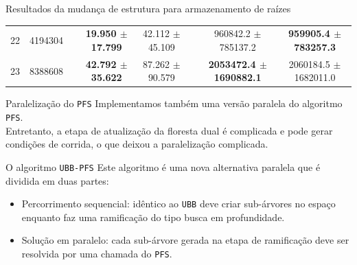\documentclass{beamer}
\newcommand{\algname}[1]{\texttt{#1}}
\begin{document}
\begin{frame}{Resultados da mudança de estrutura para armazenamento de raízes}
\begin{table}
{\begin{tabular}{cc c cc c cc}
22 & 4194304 &&  \textbf{19.950 $\pm$ 17.799} & 42.112 $\pm$ 45.109 &&  960842.2 $\pm$ 785137.2 & \textbf{959905.4 $\pm$ 783257.3} \\
23 & 8388608 &&  \textbf{42.792 $\pm$ 35.622} & 87.262 $\pm$ 90.579 &&  \textbf{2053472.4 $\pm$ 1690882.1} & 2060184.5 $\pm$ 1682011.0 \\
\bottomrule 
\end{tabular}%
}
\end{table}
\end{frame}


\begin{frame}{Paralelização do \algname{PFS}}
Implementamos também uma versão paralela do algoritmo \algname{PFS}.
\vspace{1em}
\pause\\

Entretanto, a etapa de atualização da floresta dual é complicada e pode 
gerar condições de corrida, o que deixou a paralelização complicada.
\end{frame}

\begin{frame}{O algoritmo \algname{UBB-PFS}}
Este algoritmo é uma nova alternativa paralela que é dividida em duas
partes:
\vspace{1em}
\pause\\
\begin{itemize}
  \item{Percorrimento sequencial: idêntico ao \algname{UBB} deve criar
    sub-árvores no espaço enquanto faz uma ramificação do tipo
    busca em profundidade.}
  \pause
  \item{Solução em paralelo: cada sub-árvore gerada na etapa de 
    ramificação deve ser resolvida por uma chamada do \algname{PFS}.}
\end{itemize}
\end{frame}
\end{document}

